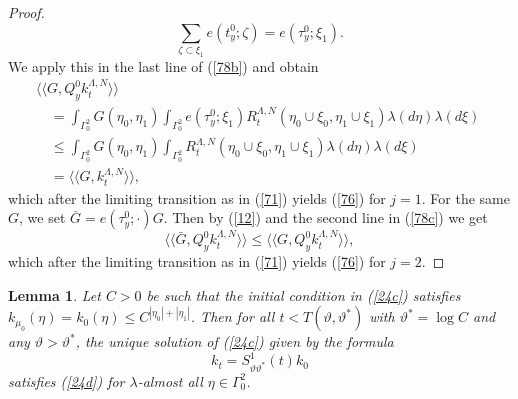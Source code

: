 \documentclass[reqno,11pt]{amsart}
\newtheorem{lemma}[theorem]{Lemma}
\theoremstyle{definition}
\theoremstyle{remark}
\numberwithin{equation}{section}
\begin{document}
\begin{proof}
\begin{equation*}
 \sum_{\zeta \subset \xi_1} e(t^0_y;\zeta) = e(\tau^0_y;\xi_1).
\end{equation*}
We apply this in the last line of (\ref{78b}) and obtain
\begin{eqnarray}
  \label{78c}
& & \langle \! \langle G, Q^0_y k^{\Lambda,N}_t \rangle \! \rangle
\\[.2cm] & & \quad =  \int_{\Gamma_0^2} G(\eta_0, \eta_1) \int_{\Gamma_0^2}
 e(\tau^0_y;\xi_1)
R^{\Lambda,N}_t(\eta_0\cup \xi_0, \eta_1 \cup \xi_1) \lambda(d\eta)
\lambda ( d \xi)\nonumber \qquad \\[.2cm]
& & \quad \leq \int_{\Gamma_0^2} G(\eta_0, \eta_1) \int_{\Gamma_0^2}
 R^{\Lambda,N}_t(\eta_0\cup \xi_0, \eta_1 \cup \xi_1) \lambda(d\eta)
\lambda ( d \xi)\nonumber \qquad \\[.2cm] & & \quad = \langle \! \langle G,  k^{\Lambda,N}_t \rangle \!
\rangle, \nonumber
\end{eqnarray}
which after the limiting transition as in (\ref{71}) yields
(\ref{76}) for $j=1$. For the same $G$, we set $\bar{G} =
e(\tau^0_y;\cdot) G$. Then by (\ref{12}) and the second line in
(\ref{78c}) we get
\begin{equation*}
  
\langle \! \langle \bar{G}, Q^0_y k^{\Lambda,N}_t \rangle \! \rangle
\leq \langle \! \langle G, Q^0_y k^{\Lambda,N}_t \rangle \! \rangle,
\end{equation*}
which after the limiting transition as in (\ref{71}) yields
(\ref{76}) for $j=2$.
\end{proof}
\begin{lemma}
  \label{J2lm}
Let $C>0$ be such that the initial condition in (\ref{24c})
satisfies $k_{\mu_0}(\eta) =k_0 (\eta) \leq C^{|\eta_0|+|\eta_1|}$.
Then for all $t< T (\vartheta, \vartheta^*)$ with $\vartheta^* =
\log C$ and any $\vartheta> \vartheta^*$, the unique solution of
(\ref{24c}) given by the formula
\begin{equation}
  \label{Sol}
k_t = S^1_{\vartheta \vartheta^*} (t) k_0
\end{equation}
satisfies (\ref{24d}) for $\lambda$-almost all $\eta\in \Gamma_0^2$.
\end{lemma}
\end{document}
